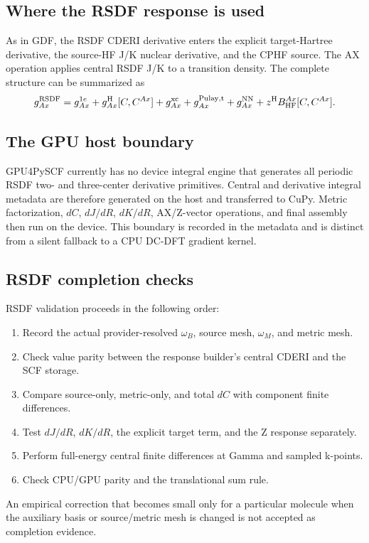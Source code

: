 \subsection{Where the RSDF response is used}

As in GDF, the RSDF CDERI derivative enters the explicit target-Hartree
derivative, the source-HF J/K nuclear derivative, and the CPHF source.  The AX
operation applies central RSDF J/K to a transition density.  The complete
structure can be summarized as
\begin{equation}
  g_{Ax}^{\mathrm{RSDF}}
  =g_{Ax}^{1e}+g_{Ax}^{\mathrm H}[C,C^{Ax}]
   +g_{Ax}^{\mathrm{xc}}+g_{Ax}^{\mathrm{Pulay,t}}
   +g_{Ax}^{\mathrm{NN}}+z^{\mathrm{H}} B_{\mathrm{HF}}^{Ax}[C,C^{Ax}].
  \label{eq:rsdf-total-gradient}
\end{equation}

\subsection{The GPU host boundary}

GPU4PySCF currently has no device integral engine that generates all periodic
RSDF two- and three-center derivative primitives.  Central and derivative
integral metadata are therefore generated on the host and transferred to
CuPy.  Metric factorization, $dC$, $dJ/dR$, $dK/dR$, AX/Z-vector operations,
and final assembly then run on the device.  This boundary is recorded in the
metadata and is distinct from a silent fallback to a CPU DC-DFT gradient
kernel.

\subsection{RSDF completion checks}

RSDF validation proceeds in the following order:
\begin{enumerate}
  \item Record the actual provider-resolved $\omega_B$, source mesh,
        $\omega_M$, and metric mesh.
  \item Check value parity between the response builder's central CDERI and
        the SCF storage.
  \item Compare source-only, metric-only, and total $dC$ with component finite
        differences.
  \item Test $dJ/dR$, $dK/dR$, the explicit target term, and the Z response
        separately.
  \item Perform full-energy central finite differences at Gamma and sampled
        k-points.
  \item Check CPU/GPU parity and the translational sum rule.
\end{enumerate}

An empirical correction that becomes small only for a particular molecule
when the auxiliary basis or source/metric mesh is changed is not accepted as
completion evidence.
